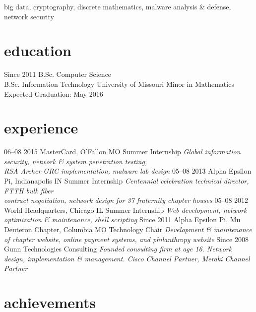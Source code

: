 \documentclass[print]{gunn-resume}
\begin{document}
big data, cryptography, discrete mathematics, malware analysis \& defense, network security
\section{education}

\begin{entrylist}
  \entry
    {Since 2011}
    {B.Sc. {\normalfont Computer Science}\\
    B.Sc. {\normalfont Information Technology}}
    {University of Missouri}
    {Minor in Mathematics\\
    Expected Graduation: May 2016}
\end{entrylist}

\section{experience}

\begin{entrylist}
 \entry
    {06–08 2015}
    {MasterCard, O'Fallon MO}
    {Summer Internship}
    {\emph{Global information security, network \& system penetration testing,\\RSA Archer GRC implementation, malware lab design}}
  \entry
    {05–08 2013}
    {Alpha Epsilon Pi, Indianapolis IN}
    {Summer Internship}
    {\emph{Centennial celebration technical director, FTTH bulk fiber\\ contract negotiation, network design for 37 fraternity chapter houses}}
  \entry
    {05–08 2012}
    {World Headquarters, Chicago IL}
    {Summer Internship}
    {\emph{Web development, network optimization \& maintenance, shell scripting}}
      \entry
    {Since 2011}
    {Alpha Epsilon Pi, Mu Deuteron Chapter, Columbia MO}
    {Technology Chair}
    {\emph{Development \& maintenance of chapter website, online payment systems, and philanthropy website}}
  \entry
    {Since 2008}
    {Gunn Technologies}
    {Consulting}
    {\emph{Founded consulting firm at age 16. Network design, implementation \& management. Cisco Channel Partner, Meraki Channel Partner}}
\end{entrylist}

\section{achievements}
\end{document}
